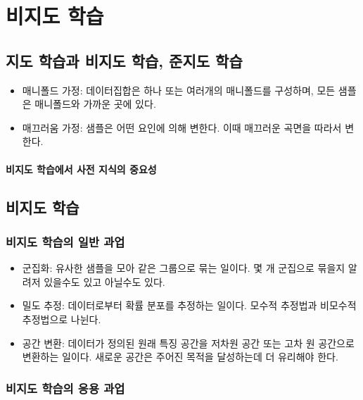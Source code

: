 \documentclass [12pt] {oblivoir}
\let\oldsubsubsection=\subsubsection
\renewcommand{\subsubsection}
{
  \filbreak
  \oldsubsubsection
}
\begin{document}
\section{비지도 학습}

\subsection{지도 학습과 비지도 학습, 준지도 학습}

\begin{itemize}
  \item 매니폴드 가정: 데이터집합은 하나 또는 여러개의 매니폴드를 구성하며, 모든 샘플은 매니폴드와 가까운 곳에 있다.
  \item 매끄러움 가정: 샘플은 어떤 요인에 의해 변한다. 이때 매끄러운 곡면을 따라서 변한다.
\end{itemize}

\paragraph*{비지도 학습에서 사전 지식의 중요성}\mbox{}

\vspace{3mm}

\subsection{비지도 학습}

\subsubsection{비지도 학습의 일반 과업}

\begin{itemize}
  \item 군집화: 유사한 샘플을 모아 같은 그룹으로 묶는 일이다. 몇 개 군집으로 묶을지 알려저 있을수도 있고 아닐수도 있다.
  \item 밀도 추정: 데이터로부터 확률 분포를 추정하는 일이다. 모수적 추정법과 비모수적 추정법으로 나뉜다.
  \item 공간 변환: 데이터가 정의된 원래 특징 공간을 저차원 공간 또는 고차 원 공간으로 변환하는 일이다. 새로운 공간은 주어진 목적을 달성하는데 더 유리해야 한다.
\end{itemize}

\subsubsection{비지도 학습의 응용 과업}
\end{document}
